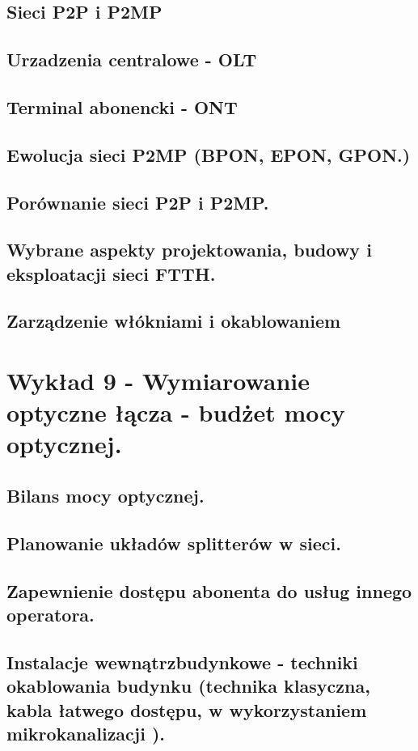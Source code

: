 \documentclass{article}
\begin{document}
\subsection{Sieci P2P i P2MP}
\subsection{Urzadzenia centralowe - OLT}
\subsection{Terminal abonencki - ONT}
\subsection{Ewolucja sieci P2MP (BPON, EPON, GPON.)}
\subsection{Porównanie sieci P2P i P2MP.}
\subsection{Wybrane aspekty projektowania, budowy i eksploatacji sieci FTTH.}
\subsection{Zarządzenie włókniami i okablowaniem}

\section{Wykład 9 - Wymiarowanie optyczne łącza - budżet mocy optycznej.}
\subsection{Bilans mocy optycznej.}
\subsection{Planowanie układów splitterów w sieci.}
\subsection{Zapewnienie dostępu abonenta do usług innego operatora.}
\subsection{Instalacje wewnątrzbudynkowe - techniki okablowania budynku (technika klasyczna, kabla łatwego dostępu, w wykorzystaniem mikrokanalizacji ).}
\end{document}
